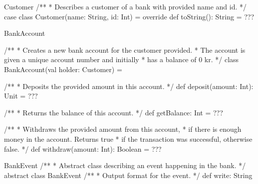 \begin{ScalaSpec}{Customer}
/**
 * Describes a customer of a bank with provided name and id.
 */
case class Customer(name: String, id: Int) = {
	override def toString(): String = ???
}

\end{ScalaSpec}


\begin{ScalaSpec}{BankAccount}

/**
 * Creates a new bank account for the customer provided.
 * The account is given a unique account number and initially
 * has a balance of 0 kr.
 */
class BankAccount(val holder: Customer) = {

  /**
   * Deposits the provided amount in this account.
   */
  def deposit(amount: Int): Unit = ???

  /**
   * Returns the balance of this account.
   */
  def getBalance: Int = ???

  /**
   * Withdraws the provided amount from this account,
   * if there is enough money in the account. Returns true
   * if the transaction was successful, otherwise false.
   */
  def withdraw(amount: Int): Boolean = ???

}
\end{ScalaSpec}


\begin{ScalaSpec}{BankEvent}
/**
 * Abstract class describing an event happening in the bank.
 */
abstract class BankEvent {
  /**
   * Output format for the event.
   */
  def write: String
}

\end{ScalaSpec}


